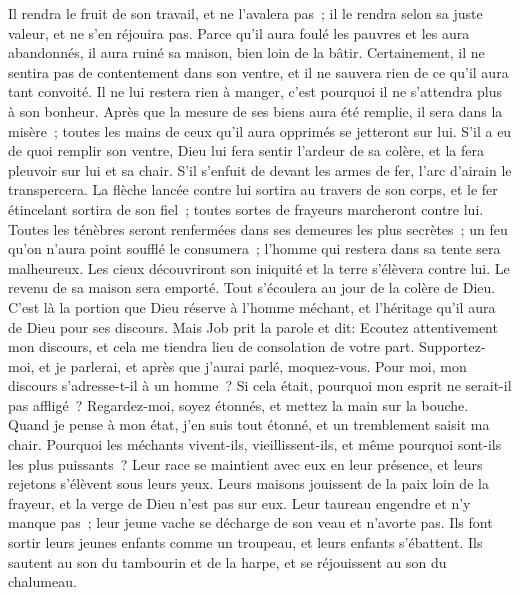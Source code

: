 \begin{multicols}{2}
Il rendra le fruit de son travail, et ne l'avalera pas~; il le rendra selon sa juste valeur, et ne s'en réjouira pas.
Parce qu'il aura foulé les pauvres et les aura abandonnés, il aura ruiné sa maison, bien loin de la bâtir.
Certainement, il ne sentira pas de contentement dans son ventre, et il ne sauvera rien de ce qu'il aura tant convoité.
Il ne lui restera rien à manger, c'est pourquoi il ne s'attendra plus à son bonheur.
Après que la mesure de ses biens aura été remplie, il sera dans la misère~; toutes les mains de ceux qu'il aura opprimés se jetteront sur lui.
S'il a eu de quoi remplir son ventre, Dieu lui fera sentir l'ardeur de sa colère, et la fera pleuvoir sur lui et sa chair.
S'il s'enfuit de devant les armes de fer, l'arc d'airain le transpercera.
La flèche lancée contre lui sortira au travers de son corps, et le fer étincelant sortira de son fiel~; toutes sortes de frayeurs marcheront contre lui.
Toutes les ténèbres seront renfermées dans ses demeures les plus secrètes~; un feu qu'on n'aura point soufflé le consumera~; l'homme qui restera dans sa tente sera malheureux.
Les cieux découvriront son iniquité et la terre s'élèvera contre lui.
Le revenu de sa maison sera emporté. Tout s'écoulera au jour de la colère de Dieu.
C'est là la portion que Dieu réserve à l'homme méchant, et l'héritage qu'il aura de Dieu pour ses discours.
\VerseOne{}Mais Job prit la parole et dit:
Ecoutez attentivement mon discours, et cela me tiendra lieu de consolation de votre part.
Supportez-moi, et je parlerai, et après que j'aurai parlé, moquez-vous.
Pour moi, mon discours s'adresse-t-il à un homme~? Si cela était, pourquoi mon esprit ne serait-il pas affligé~?
Regardez-moi, soyez étonnés, et mettez la main sur la bouche.
Quand je pense à mon état, j'en suis tout étonné, et un tremblement saisit ma chair.
Pourquoi les méchants vivent-ils, vieillissent-ils, et même pourquoi sont-ils les plus puissants~?
Leur race se maintient avec eux en leur présence, et leurs rejetons s'élèvent sous leurs yeux.
Leurs maisons jouissent de la paix loin de la frayeur, et la verge de Dieu n'est pas sur eux.
Leur taureau engendre et n'y manque pas~; leur jeune vache se décharge de son veau et n'avorte pas.
Ils font sortir leurs jeunes enfants comme un troupeau, et leurs enfants s'ébattent.
Ils sautent au son du tambourin et de la harpe, et se réjouissent au son du chalumeau.

\end{multicols}
